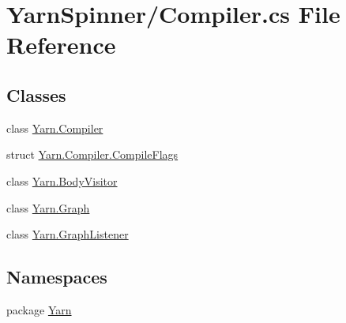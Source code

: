 \hypertarget{a00284}{\section{Yarn\-Spinner/\-Compiler.cs File Reference}
\label{a00284}
}
\subsection*{Classes}
\begin{DoxyCompactItemize}
\item 
class \hyperlink{a00053}{Yarn.\-Compiler}
\item 
struct \hyperlink{a00053_a00350}{Yarn.\-Compiler.\-Compile\-Flags}
\item 
class \hyperlink{a00044}{Yarn.\-Body\-Visitor}
\item 
class \hyperlink{a00105}{Yarn.\-Graph}
\item 
class \hyperlink{a00106}{Yarn.\-Graph\-Listener}
\end{DoxyCompactItemize}
\subsection*{Namespaces}
\begin{DoxyCompactItemize}
\item 
package \hyperlink{a00050}{Yarn}
\end{DoxyCompactItemize}
